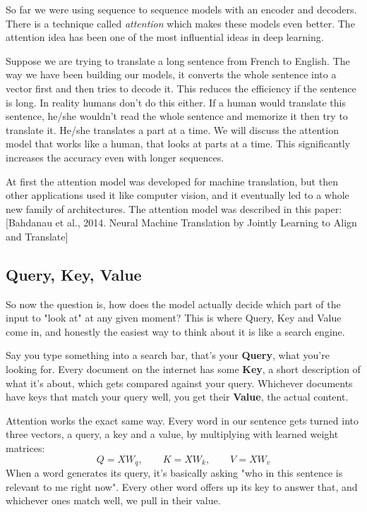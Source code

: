 \documentclass[12pt]{article}
\begin{document}
So far we were using sequence to sequence models with an encoder and decoders. There is a technique called \textit{attention} which makes these models even better. The attention idea has been one of the most influential ideas in deep learning.

Suppose we are trying to translate a long sentence from French to English. The way we have been building our models, it converts the whole sentence into a vector first and then tries to decode it. This reduces the efficiency if the sentence is long. In reality humans don't do this either. If a human would translate this sentence, he/she wouldn't read the whole sentence and memorize it then try to translate it. He/she translates a part at a time. We will discuss the attention model that works like a human, that looks at parts at a time. This significantly increases the accuracy even with longer sequences.

At first the attention model was developed for machine translation, but then other applications used it like computer vision, and it eventually led to a whole new family of architectures. The attention model was described in this paper: [Bahdanau et al., 2014. Neural Machine Translation by Jointly Learning to Align and Translate]

\subsection{Query, Key, Value}

So now the question is, how does the model actually decide which part of the input to "look at" at any given moment? This is where Query, Key and Value come in, and honestly the easiest way to think about it is like a search engine.

Say you type something into a search bar, that's your \textbf{Query}, what you're looking for. Every document on the internet has some \textbf{Key}, a short description of what it's about, which gets compared against your query. Whichever documents have keys that match your query well, you get their \textbf{Value}, the actual content.

Attention works the exact same way. Every word in our sentence gets turned into three vectors, a query, a key and a value, by multiplying with learned weight matrices:
$$Q = XW_q, \qquad K = XW_k, \qquad V = XW_v$$
When a word generates its query, it's basically asking "who in this sentence is relevant to me right now". Every other word offers up its key to answer that, and whichever ones match well, we pull in their value.
\end{document}
